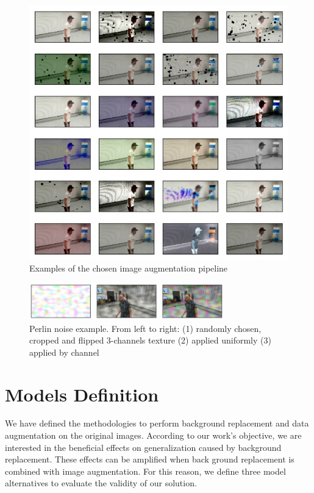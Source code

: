 \begin{figure}[!h]
	\centering
	\includegraphics[width=1 \textwidth]{"contents/images/05-imgaug-chosen"}
	\caption[Examples of the chosen image augmentation pipeline]{Examples of the chosen image augmentation pipeline}
	\label{fig:albumentation-chosen}
\end{figure}

\begin{figure}[!h]
	\centering
	\includegraphics[width=0.75\textwidth]{"contents/images/05-imgaug-pelin"}
	\caption[Perlin noise example]{Perlin noise example. From left to right: (1) randomly chosen, cropped and flipped 3-channels texture (2) applied uniformly (3) applied by channel}
	\label{fig:perlin-noise}
\end{figure}




\section{Models Definition}
\label{sec:model-variants}

We have defined the methodologies to perform background replacement and data augmentation on the original images. According to our work's objective, we are interested in the beneficial effects on generalization caused by background replacement.  These effects can be amplified when back ground replacement is combined with image augmentation. For this reason, we define three model alternatives to evaluate the validity of our solution.

